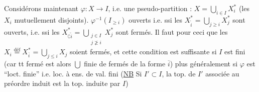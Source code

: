 Considérons maintenant $\varphi:X\longrightarrow I$, i.e. une pseudo-partition : $X=\bigcup_{i\in I}X_i^*$
(les $X_i$ mutuellement disjoints).  
$\varphi^{-1}(I_{\geq i})$ ouverts
 i.e. ssi les $X_{\widetilde i}^*=\bigcup_{j\geq i}X_j^*$ sont ouverts, i.e. ssi les
$X_{\complement\widetilde i}^*=\bigcup_{\substack{j\in I\\j\not\geq i}}X_j^*$
sont fermés. Il faut pour ceci que les
$X_i\overset{\mathrm{déf}}=X_{\overline i}^*=\bigcup_{j\leq i}X_j$
soient fermés, et cette condition est suffisante
si $I$ est fini (car tt fermé est alors $\bigcup$ finie de fermés de la forme $\overline i$)
plus généralement si $\varphi$ est ``loct. finie'' i.e. loc. à ens. de val. fini
(\uline{NB} Si $I'\subset I$, la top. de $I'$ associée au préordre induit est la top. induite
par $I$)


